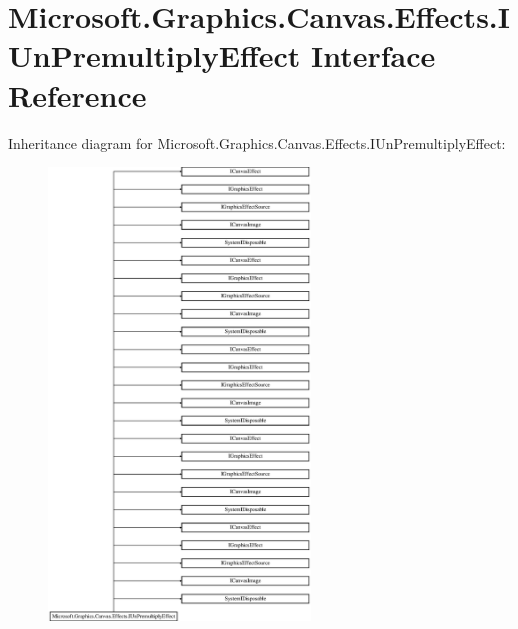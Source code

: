 \hypertarget{interface_microsoft_1_1_graphics_1_1_canvas_1_1_effects_1_1_i_un_premultiply_effect}{}\section{Microsoft.\+Graphics.\+Canvas.\+Effects.\+I\+Un\+Premultiply\+Effect Interface Reference}
\label{interface_microsoft_1_1_graphics_1_1_canvas_1_1_effects_1_1_i_un_premultiply_effect}
Inheritance diagram for Microsoft.\+Graphics.\+Canvas.\+Effects.\+I\+Un\+Premultiply\+Effect\+:\begin{figure}[H]
\begin{center}
\leavevmode
\includegraphics[height=12.000000cm]{interface_microsoft_1_1_graphics_1_1_canvas_1_1_effects_1_1_i_un_premultiply_effect}
\end{center}
\end{figure}
